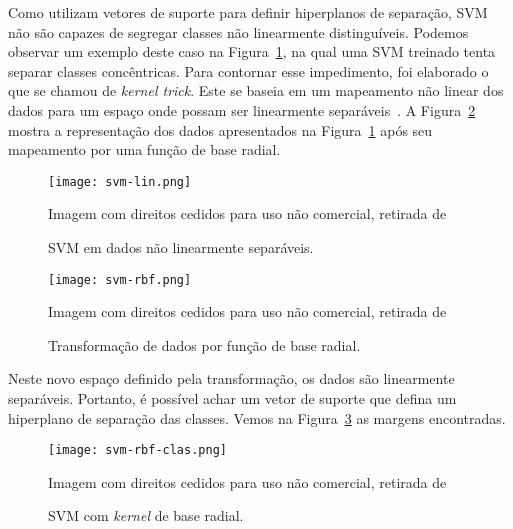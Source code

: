 Como utilizam vetores de suporte para definir hiperplanos de separação, SVM não são capazes de segregar classes não
linearmente distinguíveis.
Podemos observar um exemplo deste caso na Figura~\ref{fig:svm-lin}, na qual uma SVM treinado tenta separar classes
concêntricas.
Para contornar esse impedimento, foi elaborado o que se chamou de \textit{kernel trick}.
Este se baseia em um mapeamento não linear dos dados para um espaço onde possam ser linearmente
separáveis~\cite{scholkopf02}.
A Figura~\ref{fig:svm-rbf} mostra a representação dos dados apresentados na Figura~\ref{fig:svm-lin} após seu mapeamento
por uma função de base radial.

\begin{figure}
\begin{center} {
    \begin{center}
    \texttt{[image: svm-lin.png]}
    \caption{SVM em dados não linearmente separáveis.}
    \small Imagem com direitos cedidos para uso não comercial, retirada de~\cite{vanderplas15}
    \label{fig:svm-lin}
    \end{center}
}
\end{center}
\end{figure}

\begin{figure}
\begin{center} {
    \begin{center}
    \texttt{[image: svm-rbf.png]}
    \caption{Transformação de dados por função de base radial.}
    \small Imagem com direitos cedidos para uso não comercial, retirada de~\cite{vanderplas15}
    \label{fig:svm-rbf}
    \end{center}
}
\end{center}
\end{figure}

Neste novo espaço definido pela transformação, os dados são linearmente separáveis.
Portanto, é possível achar um vetor de suporte que defina um hiperplano de separação das classes.
Vemos na Figura~\ref{fig:svm-rbf-clas} as margens encontradas.

\begin{figure}
\begin{center} {
    \begin{center}
    \texttt{[image: svm-rbf-clas.png]}
    \caption{SVM com \textit{kernel} de base radial.}
    \small Imagem com direitos cedidos para uso não comercial, retirada de~\cite{vanderplas15}
    \label{fig:svm-rbf-clas}
    \end{center}
}
\end{center}
\end{figure}

